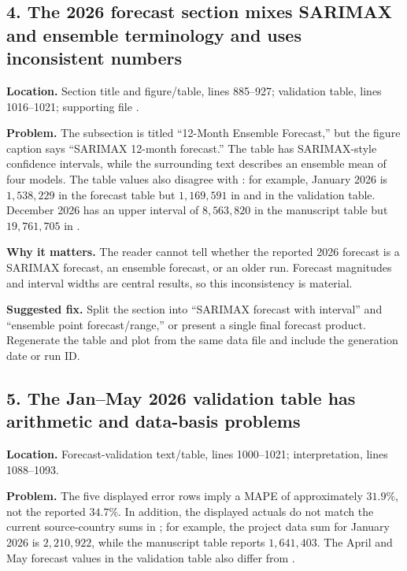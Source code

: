\documentclass[11pt]{article}
\begin{document}
\subsection*{4. The 2026 forecast section mixes SARIMAX and ensemble terminology and uses inconsistent numbers}

\textbf{Location.} Section title and figure/table, lines 885--927; validation table, lines 1016--1021; supporting file .

\textbf{Problem.} The subsection is titled ``12-Month Ensemble Forecast,'' but the figure caption says ``SARIMAX 12-month forecast.'' The table has SARIMAX-style confidence intervals, while the surrounding text describes an ensemble mean of four models. The table values also disagree with : for example, January 2026 is \(1{,}538{,}229\) in the forecast table but \(1{,}169{,}591\) in  and in the validation table. December 2026 has an upper interval of \(8{,}563{,}820\) in the manuscript table but \(19{,}761{,}705\) in .

\textbf{Why it matters.} The reader cannot tell whether the reported 2026 forecast is a SARIMAX forecast, an ensemble forecast, or an older run. Forecast magnitudes and interval widths are central results, so this inconsistency is material.

\textbf{Suggested fix.} Split the section into ``SARIMAX forecast with interval'' and ``ensemble point forecast/range,'' or present a single final forecast product. Regenerate the table and plot from the same data file and include the generation date or run ID.

\subsection*{5. The Jan--May 2026 validation table has arithmetic and data-basis problems}

\textbf{Location.} Forecast-validation text/table, lines 1000--1021; interpretation, lines 1088--1093.

\textbf{Problem.} The five displayed error rows imply a MAPE of approximately \(31.9\%\), not the reported \(34.7\%\). In addition, the displayed actuals do not match the current source-country sums in ; for example, the project data sum for January 2026 is \(2{,}210{,}922\), while the manuscript table reports \(1{,}641{,}403\). The April and May forecast values in the validation table also differ from .
\end{document}
